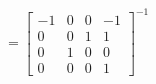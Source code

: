 \documentclass[preview]{standalone}
\begin{document}
\begin{center}
$ = \begin{bmatrix}-1 & 0 & 0 & -1 \\ 0 & 0 & 1 & 1 \\ 0 & 1 & 0 & 0\\ 0 & 0 & 0 & 1\end{bmatrix}^{-1}$
\end{center}
\end{document}
